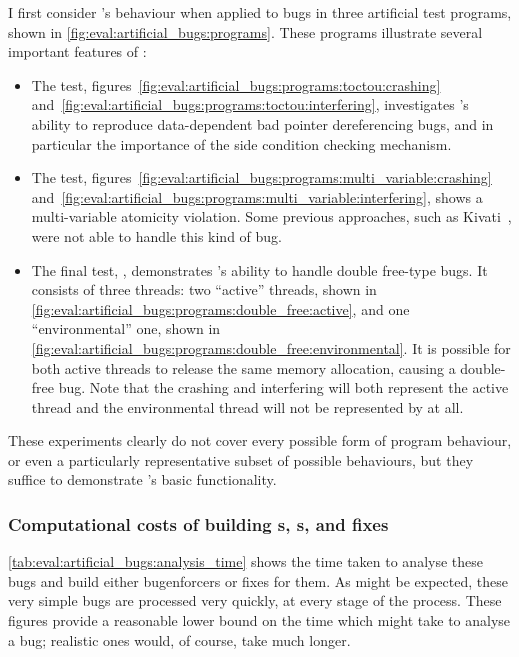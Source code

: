 \noindent
I first consider {\implementation}'s behaviour when applied to bugs in
three artificial test programs, shown in
\autoref{fig:eval:artificial_bugs:programs}.  These programs
illustrate several important features of {\technique}:
\begin{itemize}
  \item The  test,
    figures~\ref{fig:eval:artificial_bugs:programs:toctou:crashing}
    and~\ref{fig:eval:artificial_bugs:programs:toctou:interfering},
    investigates {\implementation}'s ability to reproduce data-dependent
    bad pointer dereferencing bugs, and in particular the importance
    of the \gls{side condition} checking mechanism.
  \item The  test,
    figures~\ref{fig:eval:artificial_bugs:programs:multi_variable:crashing}
    and~\ref{fig:eval:artificial_bugs:programs:multi_variable:interfering},
    shows a multi-variable atomicity violation.  Some previous
    approaches, such as Kivati~\cite{Chew2010}, were not able to handle
    this kind of bug.
  \item The final test, , demonstrates
    {\implementation}'s ability to handle double free-type bugs.  It
    consists of three threads: two ``active'' threads, shown in
    \autoref{fig:eval:artificial_bugs:programs:double_free:active},
    and one ``environmental'' one, shown in
    \autoref{fig:eval:artificial_bugs:programs:double_free:environmental}.
    It is possible for both active threads to release the same memory
    allocation, causing a double-free bug.  Note that the crashing and
    interfering {\StateMachines} will both represent the active thread
    and the environmental thread will not be represented by
    {\AStateMachine} at all.
\end{itemize}
These experiments clearly do not cover every possible form of program
behaviour, or even a particularly representative subset of possible
behaviours, but they suffice to demonstrate {\technique}'s basic
functionality.

\subsubsection{Computational costs of building s, s, and fixes}

\autoref{tab:eval:artificial_bugs:analysis_time} shows the time taken
to analyse these bugs and build either \glspl{bugenforcer} or fixes
for them.  As might be expected, these very simple bugs are processed
very quickly, at every stage of the process.  These figures provide a
reasonable lower bound on the time which {\implementation} might take to
analyse a bug; realistic ones would, of course, take much longer.

